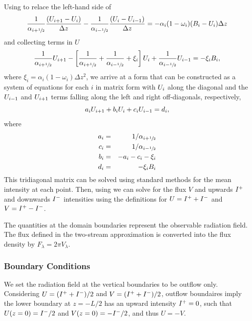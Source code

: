 Using  to relace the left-hand side of 
\begin{equation}
      \frac{1}{\alpha_{i+\sfrac{1}{2}}} \frac{(U_{i+1} - U_i)}{\Delta z} 
    - \frac{1}{\alpha_{i-\sfrac{1}{2}}} \frac{(U_i - U_{i-1})}{\Delta z}  
    = - \alpha_i (1 - \omega_i)(B_i - U_i) \Delta z
\end{equation}
and collecting terms in $U$
\begin{equation}
    \frac{1}{\alpha_{i+\sfrac{1}{2}}} U_{i+1} - \left[ \frac{1}{\alpha_{i+\sfrac{1}{2}}}+ \frac{1}{\alpha_{i-\sfrac{1}{2}}} + \xi_i  \right] U_i + \frac{1}{\alpha_{i-\sfrac{1}{2}}} U_{i-1}  = - \xi_i B_i,
\end{equation}
where $\xi_i = \alpha_i (1 - \omega_i) \Delta z^2$, we arrive at a form that can be constructed as a system of equations for each $i$ in matrix form with $U_i$ along the diagonal and the $U_{i-1}$ and $U_{i+1}$ terms falling along the left and right off-diagonals, respectively, 
\begin{equation}
    a_i U_{i+1} + b_i U_i + c_i U_{i-1} = d_i, \label{eqn:system-in-U_i}
\end{equation}
where
\begin{eqnarray}
    a_i &=& 1/\alpha_{i+\sfrac{1}{2}} \\
    c_i &=& 1/\alpha_{i-\sfrac{1}{2}} \\
    b_i &=& -a_i - c_i - \xi_i \\
    d_i &=& - \xi_i B_i
\end{eqnarray}
This tridiagonal matrix can be solved using standard methods for the mean intensity at each point.
Then, using  we can solve for the flux $V$ and upwards $I^+$ and downwards $I^-$ intensities using the definitions for $U = I^+ + I^-$ and $V = I^+ - I^-$.

The quantities at the domain boundaries represent the observable radiation field.
The flux defined in the two-stream approximation is converted into the flux density by $F_\lambda = 2 \pi V_\lambda$.

\subsubsection{Boundary Conditions}
We set the radiation field at the vertical boundaries to be outflow only.
Considering $U = (I^+ + I^-) / 2$ and $V = (I^+ + I^-) / 2$, outflow boundaires imply the lower boundary at $z=-L/2$ has an upward intensity $I^+=0$, such that $U(z=0) = I^-/2$ and $V(z=0)=-I^-/2$, and thus $U=-V$.

